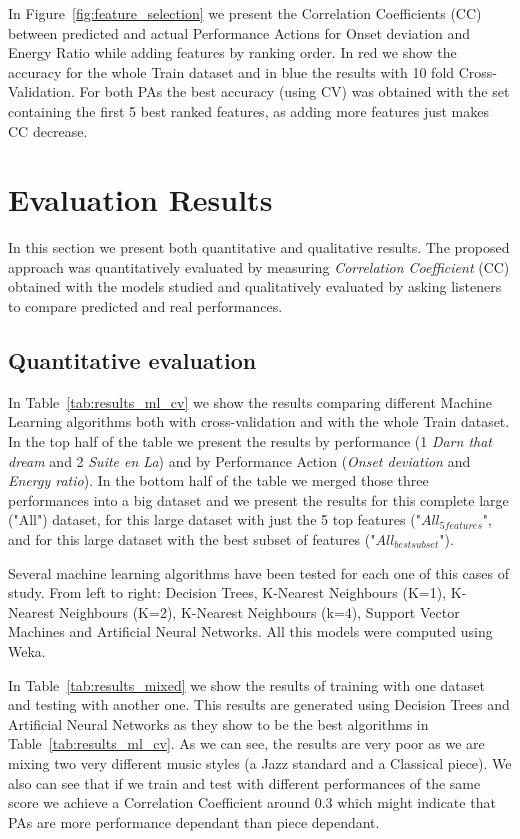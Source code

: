 In Figure~\ref{fig:feature_selection} we present the Correlation Coefficients (CC) between predicted and actual Performance Actions for Onset deviation and Energy Ratio while adding features by ranking order. In red we show the accuracy for the whole Train dataset and in blue the results with 10 fold Cross-Validation. For both PAs the best accuracy (using CV) was obtained with the set containing the first 5 best ranked features, as adding more features just makes CC decrease.





\section{Evaluation Results}
\label{sec:ev_results}
In this section we present both quantitative and qualitative results. The proposed approach was quantitatively evaluated by measuring \textit{Correlation Coefficient} (CC) obtained with the models studied and qualitatively evaluated by asking listeners to compare predicted and real performances. 

\subsection{Quantitative evaluation}
In Table~\ref{tab:results_ml_cv} we show the results comparing different Machine Learning algorithms both with cross-validation and with the whole Train dataset. In the top half of the table we present the results by performance (1 \textit{Darn that dream} and 2 \textit{Suite en La}) and by Performance Action (\textit{Onset deviation} and \textit{Energy ratio}). In the bottom half of the table we merged those three performances into a big dataset and we present the results for this complete large ("All") dataset, for this large dataset with just the 5 top features ("$All_{5features}$", and for this large dataset with the best subset of features ("$All_{bestsubset}$").

Several machine learning algorithms have been tested for each one of this cases of study. From left to right: Decision Trees, K-Nearest Neighbours (K=1), K-Nearest Neighbours (K=2), K-Nearest Neighbours (k=4), Support Vector Machines and Artificial Neural Networks. All this models were computed using Weka.




%
In Table~\ref{tab:results_mixed} we show the results of training with one dataset and testing with another one. This results are generated using Decision Trees and Artificial Neural Networks as they show to be the best algorithms in Table~\ref{tab:results_ml_cv}. As we can see, the results are very poor as we are mixing two very different music styles (a Jazz standard and a Classical piece). We also can see that if we train and test with different performances of the same score we achieve a Correlation Coefficient around 0.3 which might indicate that PAs are more performance dependant than piece dependant.


